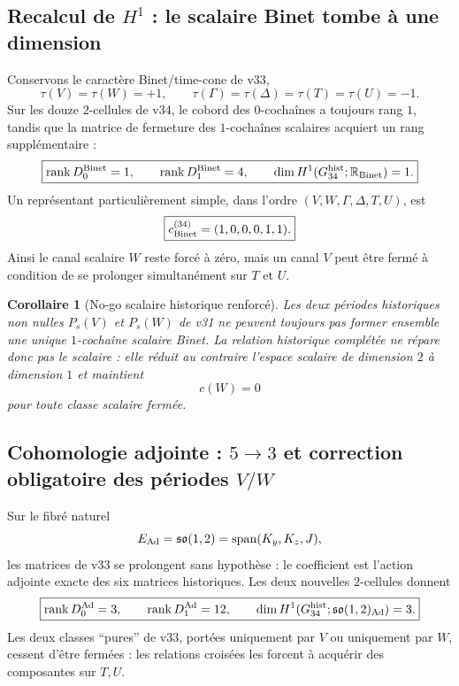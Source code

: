 \documentclass[11pt,a4paper]{article}
\newtheorem{corollary}[theorem]{Corollaire}
\newcommand{\rank}{\operatorname{rank}}
\begin{document}
\subsection{Recalcul de $H^1$ : le scalaire Binet tombe à une dimension}

Conservons le caractère Binet/time-cone de v33,
\[
 \tau(V)=\tau(W)=+1,
 \qquad
 \tau(\Gamma)=\tau(\Delta)=\tau(T)=\tau(U)=-1.
\]
Sur les douze $2$-cellules de v34, le cobord des $0$-cochaînes a toujours rang $1$, tandis que la
matrice de fermeture des $1$-cochaînes scalaires acquiert un rang supplémentaire :
\begin{equation}\label{eq:v34-binet-ranks}
 \boxed{
 \rank D_0^{\rm Binet}=1,
 \qquad
 \rank D_1^{\rm Binet}=4,
 \qquad
 \dim H^1(G_{34}^{\rm hist};\mathbb R_{\rm Binet})=1.}
\end{equation}
Un représentant particulièrement simple, dans l'ordre
$(V,W,\Gamma,\Delta,T,U)$, est
\begin{equation}\label{eq:v34-binet-rep}
 \boxed{c_{\rm Binet}^{(34)}=(1,0,0,0,1,1).}
\end{equation}
Ainsi le canal scalaire $W$ reste forcé à zéro, mais un canal $V$ peut être fermé à condition de
se prolonger simultanément sur $T$ et $U$.

\begin{corollary}[No-go scalaire historique renforcé]\label{cor:v34-scalar-memory-nogo}
Les deux périodes historiques non nulles
$P_s(V)$ et $P_s(W)$ de v31 ne peuvent toujours pas former ensemble une unique $1$-cochaîne
scalaire Binet. La relation historique complétée ne répare donc pas le scalaire : elle réduit au
contraire l'espace scalaire de dimension $2$ à dimension $1$ et maintient
\[
 \boxed{c(W)=0}
\]
pour toute classe scalaire fermée.
\end{corollary}

\subsection{Cohomologie adjointe : $5\to3$ et correction obligatoire des périodes $V/W$}

Sur le fibré naturel
\[
 E_{\rm Ad}=\mathfrak{so}(1,2)
 =\operatorname{span}(K_y,K_z,J),
\]
les matrices de v33 se prolongent sans hypothèse : le coefficient est l'action adjointe exacte des
six matrices historiques. Les deux nouvelles $2$-cellules donnent
\begin{equation}\label{eq:v34-adjoint-ranks}
 \boxed{
 \rank D_0^{\rm Ad}=3,
 \qquad
 \rank D_1^{\rm Ad}=12,
 \qquad
 \dim H^1(G_{34}^{\rm hist};\mathfrak{so}(1,2)_{\rm Ad})=3.}
\end{equation}
Les deux classes ``pures'' de v33, portées uniquement par $V$ ou uniquement par $W$, cessent
d'être fermées : les relations croisées les forcent à acquérir des composantes sur $T,U$.
\end{document}
